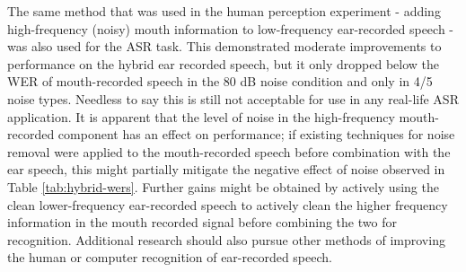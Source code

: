 The same method that was used in the human perception experiment - adding high-frequency (noisy) mouth information to low-frequency ear-recorded speech - was also used for the ASR task.  This demonstrated moderate improvements to performance on the hybrid ear recorded speech, but it only dropped below the WER of mouth-recorded speech in the 80 dB noise condition and only in 4/5 noise types.  Needless to say this is still not acceptable for use in any real-life ASR application.  It is apparent that the level of noise in the high-frequency mouth-recorded component has an effect on performance; if existing techniques for noise removal were applied to the mouth-recorded speech before combination with the ear speech, this might partially mitigate the negative effect of noise observed in Table \ref{tab:hybrid-wers}.  Further gains might be obtained by actively using the clean lower-frequency ear-recorded speech to actively clean the higher frequency information in the mouth recorded signal before combining the two for recognition.   
Additional research should also pursue other methods of improving the human or computer recognition of ear-recorded speech. 


\DIFdelbegin %


